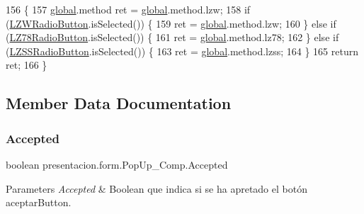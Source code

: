 \begin{DoxyCode}
156                               \{
157         \hyperlink{namespaceglobal}{global}.method ret = \hyperlink{namespaceglobal}{global}.method.lzw;
158         \textcolor{keywordflow}{if} (\hyperlink{classpresentacion_1_1form_1_1PopUp__Comp_a810fe251f9c88e3b83ce466feafafe2e}{LZWRadioButton}.isSelected()) \{
159             ret = \hyperlink{namespaceglobal}{global}.method.lzw;
160         \} \textcolor{keywordflow}{else} \textcolor{keywordflow}{if} (\hyperlink{classpresentacion_1_1form_1_1PopUp__Comp_ac750ecbde516e2fee470693124d2ff63}{LZ78RadioButton}.isSelected()) \{
161             ret = \hyperlink{namespaceglobal}{global}.method.lz78;
162         \} \textcolor{keywordflow}{else} \textcolor{keywordflow}{if} (\hyperlink{classpresentacion_1_1form_1_1PopUp__Comp_ad18c1029f04cc43d033183dca943977c}{LZSSRadioButton}.isSelected()) \{
163             ret = \hyperlink{namespaceglobal}{global}.method.lzss;
164         \}
165         \textcolor{keywordflow}{return} ret;
166     \}
\end{DoxyCode}


\subsection{Member Data Documentation}
\mbox{\label{classpresentacion_1_1form_1_1PopUp__Comp_af8e9310f7ff94d5a8cc917c66536bfde}} 
\subsubsection{\texorpdfstring{Accepted}{Accepted}}
{\footnotesize\ttfamily boolean presentacion.\+form.\+Pop\+Up\+\_\+\+Comp.\+Accepted\hspace{0.3cm}{\ttfamily [private]}}


\begin{DoxyParams}{Parameters}
{\em Accepted} & Boolean que indica si se ha apretado el botón aceptar\+Button. \\
\hline
\end{DoxyParams}
\mbox{\label{classpresentacion_1_1form_1_1PopUp__Comp_a6321172d7f93f607a1cea6e2eee6a6ea}} 
